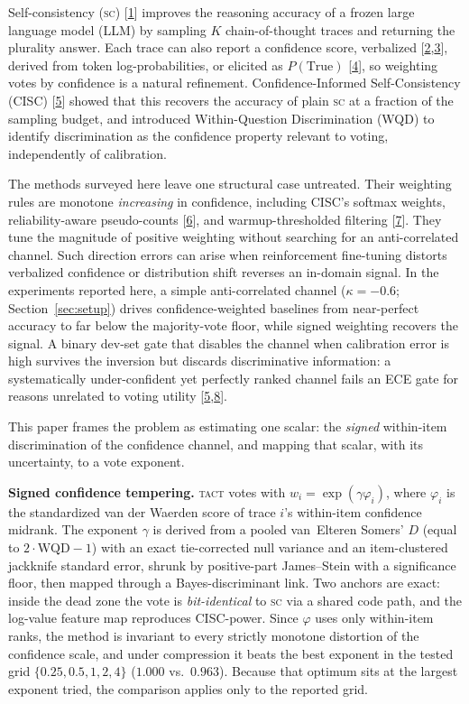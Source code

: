 \documentclass[conference]{IEEEtran}
\newcommand{\SC}{\textsc{sc}}
\newcommand{\TACT}{\textsc{tact}}
\begin{document}
Self-consistency (\SC) [\hyperlink{bib:wang2023selfconsistency}{1}] improves the reasoning accuracy of a frozen large language model (LLM) by sampling $K$ chain-of-thought traces and returning the plurality answer. Each trace can also report a confidence score, verbalized [\hyperlink{bib:tian2023just}{2},\hyperlink{bib:xiong2024can}{3}], derived from token log-probabilities, or elicited as $P(\text{True})$ [\hyperlink{bib:kadavath2022language}{4}], so weighting votes by confidence is a natural refinement. Confidence-Informed Self-Consistency (CISC) [\hyperlink{bib:taubenfeld2025cisc}{5}] showed that this recovers the accuracy of plain \SC{} at a fraction of the sampling budget, and introduced Within-Question Discrimination (WQD) to identify discrimination as the confidence property relevant to voting, independently of calibration.

The methods surveyed here leave one structural case untreated. Their weighting
rules are monotone \emph{increasing} in confidence, including CISC's softmax
weights, reliability-aware pseudo-counts [\hyperlink{bib:reasc2026}{6}], and
warmup-thresholded filtering [\hyperlink{bib:deepconf2025}{7}]. They tune the magnitude of
positive weighting without searching for an anti-correlated channel. Such
direction errors can arise when reinforcement fine-tuning distorts verbalized
confidence or distribution shift reverses an in-domain signal. In the
experiments reported here, a simple anti-correlated channel ($\kappa=-0.6$;
Section~\ref{sec:setup}) drives confidence-weighted baselines from near-perfect
accuracy to far below the majority-vote floor, while signed weighting recovers
the signal. A binary dev-set gate that disables the channel when calibration
error is high survives the inversion but discards discriminative information:
a systematically under-confident yet perfectly ranked channel fails an ECE
gate for reasons unrelated to voting utility
[\hyperlink{bib:taubenfeld2025cisc}{5},\hyperlink{bib:huang2024rankcalibration}{8}].

This paper frames the problem as estimating one scalar: the \emph{signed} within-item discrimination of the confidence channel, and mapping that scalar, with its uncertainty, to a vote exponent.

\textbf{Signed confidence tempering.} \TACT{} votes with
$w_i=\exp(\gamma\varphi_i)$, where $\varphi_i$ is the standardized van der
Waerden score of trace $i$'s within-item confidence midrank. The exponent
$\gamma$ is derived from a pooled van~Elteren Somers' $D$ (equal to
$2\cdot\mathrm{WQD}-1$) with an exact tie-corrected null variance and an
item-clustered jackknife standard error, shrunk by positive-part James--Stein
with a significance floor, then mapped through a Bayes-discriminant link. Two
anchors are exact: inside the dead zone the vote is \emph{bit-identical} to
\SC{} via a shared code path, and the log-value feature map reproduces
CISC-power. Since $\varphi$ uses only within-item ranks, the method is
invariant to every strictly monotone distortion of the confidence scale, and
under compression it beats the best exponent in the tested grid
$\{0.25,0.5,1,2,4\}$ ($1.000$ vs.\ $0.963$). Because that optimum sits at the
largest exponent tried, the comparison applies only to the reported grid.
\end{document}
